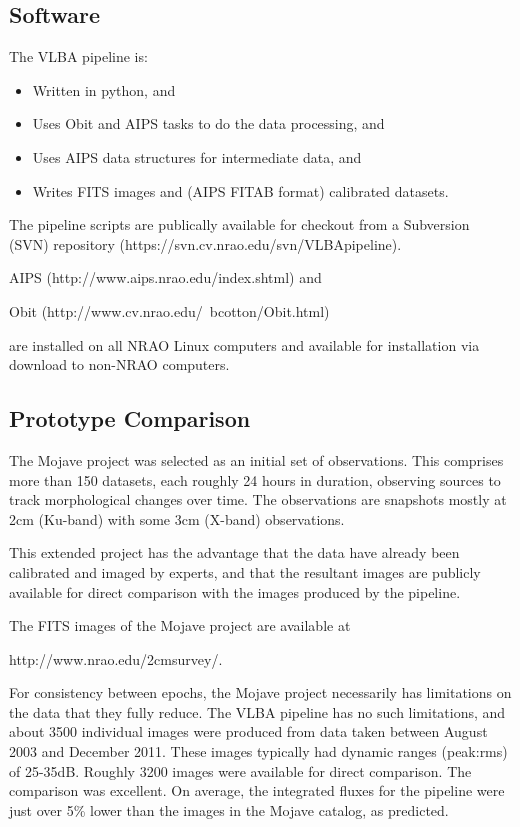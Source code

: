 \documentclass[11pt]{article}
\begin{document}
\subsection{Software}

The VLBA pipeline is:

\begin{itemize}
\item Written in python, and
\item Uses Obit and AIPS tasks to do the data processing, and
\item Uses AIPS data structures for intermediate data, and
\item Writes FITS images and (AIPS FITAB format) calibrated datasets.
\end{itemize}

The pipeline scripts are publically available for checkout from a
Subversion (SVN) repository (https://svn.cv.nrao.edu/svn/VLBApipeline).

AIPS (http://www.aips.nrao.edu/index.shtml) and

Obit (http://www.cv.nrao.edu/~bcotton/Obit.html)

are installed on all NRAO Linux computers and available for 
installation via download to non-NRAO computers.

\subsection{Prototype Comparison}

The Mojave project was selected as an initial set of observations.  This
comprises more than 150 datasets, each roughly 24 hours in duration, observing
sources to track morphological changes over time.  The observations are
snapshots mostly at 2cm (Ku-band) with some 3cm (X-band) observations.

This extended project has the advantage that the data have already
been calibrated and imaged by experts, and that the resultant images
are publicly available for direct comparison with the images produced
by the pipeline. 

The FITS images of the Mojave project are available at

http://www.nrao.edu/2cmsurvey/.

For consistency between epochs, the Mojave project necessarily has limitations
on the data that they fully reduce.  The VLBA pipeline has no such limitations,
and about 3500 individual images were produced from data taken between August
2003 and December 2011.  These images typically had dynamic ranges (peak:rms)
of 25-35dB.  Roughly 3200 images were available for direct comparison.  The
comparison was excellent.  On average, the integrated fluxes for the pipeline
were just over 5\% lower than the images in the Mojave catalog, as predicted.
\end{document}
